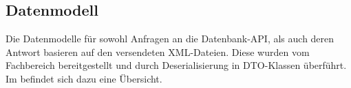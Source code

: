 \subsection{Datenmodell}
\label{sec:Datenmodell}
Die Datenmodelle für sowohl Anfragen an die Datenbank-API, als auch deren Antwort basieren auf den versendeten XML-Dateien. 
Diese wurden vom Fachbereich bereitgestellt und durch Deserialisierung in \acs{DTO}-Klassen überführt.\\
Im  befindet sich dazu eine Übersicht. 

